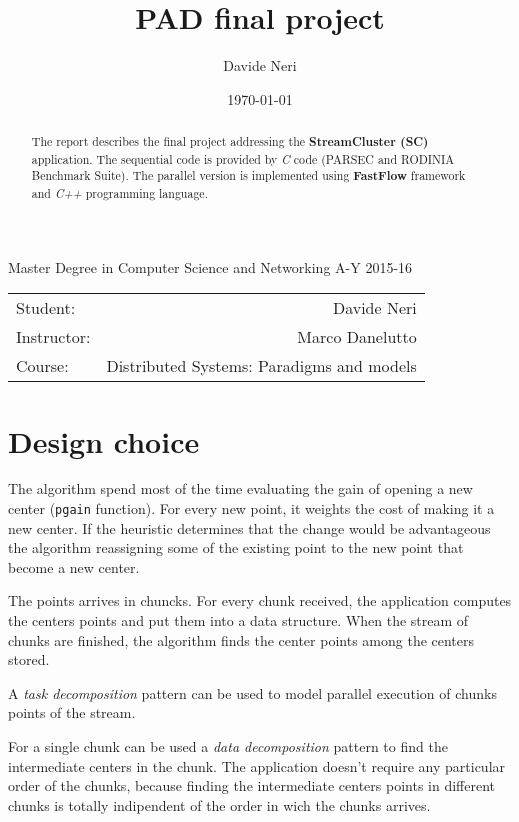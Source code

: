 \documentclass[12pt]{article}
\title{PAD final project}
\author{Davide Neri}
\date{\today}
\begin{document}
\maketitle    %
\begin{center}
Master Degree in Computer Science and Networking 
A-Y 2015-16

\end{center}

\begin{center}

\begin{tabular}{l r}
Student: & Davide Neri \\ %
Instructor: & Marco Danelutto \\%
Course: & Distributed Systems: Paradigms and models\\
\end{tabular}
\end{center}

\begin{abstract} 
The report describes the final project addressing the \textbf{StreamCluster (SC)} application. The sequential code is provided by \emph{C} code (PARSEC and RODINIA Benchmark Suite). The parallel version is implemented using \textbf{FastFlow} framework and \emph{C++} programming language.
\end{abstract}

\section{Design choice}

The algorithm spend most of the time evaluating the gain of opening a new center (\texttt{pgain} function).  For every new point, it weights the cost of making it a new center. If the heuristic determines that the change would be advantageous  the algorithm reassigning some of the existing point to the new point that become a new center.

The points arrives in chuncks. For every chunk received, the application  computes the centers points and put them into a data structure. When the stream of chunks are finished, the algorithm finds the center points among the centers stored.

A \emph{task decomposition} pattern can be used  to model parallel execution of chunks points of the stream.

For a single chunk  can be used a \emph{data decomposition} pattern to find the intermediate centers in the chunk.
The application doesn't require any particular order of the chunks, because finding the intermediate centers points in different chunks is totally indipendent of the order in wich the chunks arrives.
\end{document}
